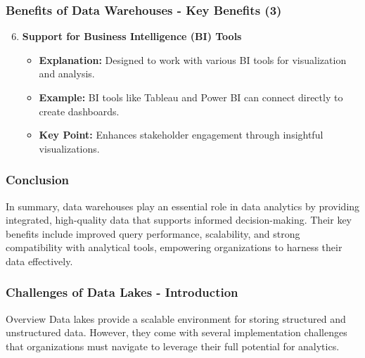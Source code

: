 \documentclass[aspectratio=169]{beamer}
\begin{document}
\begin{frame}[fragile]
    \frametitle{Benefits of Data Warehouses - Key Benefits (3)}
    \begin{enumerate}
        \setcounter{enumi}{5}
        \item \textbf{Support for Business Intelligence (BI) Tools}
            \begin{itemize}
                \item \textbf{Explanation:} Designed to work with various BI tools for visualization and analysis.
                \item \textbf{Example:} BI tools like Tableau and Power BI can connect directly to create dashboards.
                \item \textbf{Key Point:} Enhances stakeholder engagement through insightful visualizations.
            \end{itemize}
    \end{enumerate}
\end{frame}

\begin{frame}[fragile]
    \frametitle{Conclusion}
    In summary, data warehouses play an essential role in data analytics by providing integrated, high-quality data that supports informed decision-making. Their key benefits include improved query performance, scalability, and strong compatibility with analytical tools, empowering organizations to harness their data effectively.
\end{frame}

\begin{frame}[fragile]
    \frametitle{Challenges of Data Lakes - Introduction}
    \begin{block}{Overview}
        Data lakes provide a scalable environment for storing structured and unstructured data. However, they come with several implementation challenges that organizations must navigate to leverage their full potential for analytics.
    \end{block}
\end{frame}
\end{document}
